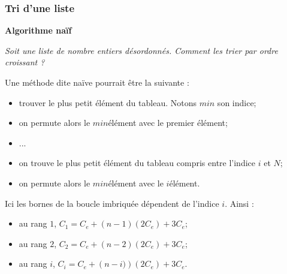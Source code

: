 \subsubsection{Tri d'une liste}

\begin{exemple}
\textbf{Algorithme naïf}

\textit{Soit une liste de nombre entiers désordonnés. Comment les trier par ordre croissant ?}

Une méthode dite naïve pourrait être la suivante : 
\begin{itemize}
\item trouver le plus petit élément du tableau. Notons $min$ son indice;
\item on permute alors le $min$\ieme élément avec le premier élément;
\item ...
\item on trouve le plus petit élément du tableau compris entre l'indice $i$ et $N$;
\item on permute alors le $min$\ieme élément avec le $i$\ieme élément.
\end{itemize}



\begin{pseudo}
\begin{algorithm}[H]

\end{algorithm}
\end{pseudo}



Ici les bornes de la boucle imbriquée dépendent de l'indice $i$. Ainsi :
\begin{itemize}
\item au rang $1$, $C_1 = C_e + \left(n-1\right)\left( 2 C_e\right) + 3 C_e$;
\item au rang $2$, $C_2 = C_e + \left(n-2\right)\left( 2 C_e\right) + 3 C_e$;
\item au rang $i$, $C_i = C_e + \left(n-i)\right)\left( 2 C_e\right) + 3 C_e$.
\end{itemize}


\end{exemple}
